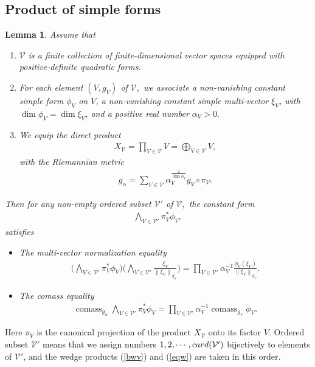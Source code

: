 \documentclass[11pt,a4paper]{amsart}
\numberwithin{equation}{section}
\newcommand{\ai}{\alpha}
\newcommand{\cms}{\operatorname{comass}}
\newcommand{\cd}{\cdots}
\newcommand{\no}[1]{\left\lVert#1\right\rVert}
\newcommand{\du}{^\ast}
\newcommand{\m}{^{-1}}
\theoremstyle{plain}
\newtheorem{lem}[exam]{Lemma}
\theoremstyle{definition}
\numberwithin{equation}{subsection}
\begin{document}
\subsection{Product of simple forms}
\begin{lem}\label{lemvfm}
		Assume that
	\begin{enumerate}
		\item $\mathcal{V}$ is a finite collection of finite-dimensional vector spaces equipped with positive-definite quadratic forms.
		\item For each element $(V,g_V)$ of $\mathcal{V},$ we associate a non-vanishing constant simple form $\phi_V$ on $V$, a non-vanishing constant simple multi-vector $\xi_V$, with $\dim\phi_V=\dim\xi_V$, and a positive real number $\ai_V>0.$
		\item We equip the direct product 	\begin{align*}
			X_{\mathcal{V}}=	\prod_{V\in\mathcal{V}}V=\bigoplus_{V\in\mathcal{V}}V,
		\end{align*}with the Riemannian metric
		\begin{align*}
		g_\ai=\sum_{V\in\mathcal{V}}\ai_V^{\frac{2}{\dim\phi_V}} g_V\circ\pi_V.
		\end{align*}
	\end{enumerate}
Then	for any non-empty ordered subset $\mathcal{V}'$ of $\mathcal{V},$ the constant form
\begin{align}\label{bwv}
	\bigwedge_{V\in \mathcal{V}'}\pi_V\du\phi_V,
\end{align}satisfies
\begin{itemize}
	\item The multi-vector normalization equality
	\begin{align}\label{eqn}
		\bigg(\bigwedge_{V\in \mathcal{V}'}\pi_V\du\phi_V\bigg)\bigg(\bigwedge_{V\in \mathcal{V}'}\frac{\xi_V}{\no{\xi_V}_{g_\ai}}\bigg)=\prod_{V\in \mathcal{V}'}\ai_V\m\frac{\phi_V(\xi_V)}{\no{\xi_V}_{g_V}}.
	\end{align}
	\item The comass equality
	\begin{align}\label{eqw}
		\cms_{g_\ai}\bigwedge_{V\in \mathcal{V}'}\pi_V\du\phi_V=\prod_{V\in\mathcal{V}'}\ai_V\m\cms_{g_V}\phi_V.
	\end{align}
\end{itemize}
\end{lem}
Here $\pi_V$ is the canonical projection of the product $X_{\mathcal{V}}$ onto its factor $V.$ Ordered subset $\mathcal{V}'$ means that we assign numbers $1,2,\cd,\textnormal{card}(\mathcal{V'})$ bijectively to elements of $\mathcal{V}'$, and the wedge products (\ref{bwv}) and (\ref{eqw}) are taken in this order.
\end{document}
